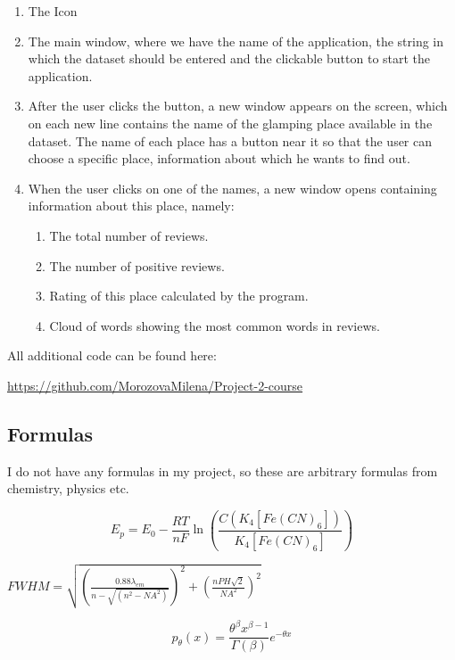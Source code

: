\documentclass[]{article}
\begin{document}
\begin{enumerate}
	\item The Icon
	\item The main window, where we have the name of the application, the string in which the dataset should be entered and the clickable button to start the application.
	\item After the user clicks the button, a new window appears on the screen, which on each new line contains the name of the glamping place available in the dataset. The name of each place has a button near it so that the user can choose a specific place, information about which he wants to find out.
	\item 	When the user clicks on one of the names, a new window opens containing information about this place, namely: 
	
	\begin{enumerate}
		\item The total number of reviews.
		\item The number of positive reviews.
		\item Rating of this place calculated by the program.
		\item Cloud of words showing the most common words in reviews.
	\end{enumerate}
\end{enumerate}

All additional code can be found here:

\url{https://github.com/MorozovaMilena/Project-2-course}

\vspace{3mm}
\subsection{Formulas}
I do not have any formulas in my project, so these are arbitrary formulas from chemistry, physics etc.

\[E_p=E_0-\frac{RT}{nF}\ln\left(\frac{C(K_4[Fe(CN)_6])}{K_4[Fe(CN)_6]}\right)\]

\vspace{2mm}

\Large $FWHM = \sqrt{(\frac{0.88\lambda_{em}}{n-\sqrt{(n^2-NA^2)}})^2+(\frac{nPH\sqrt{2}}{NA^2})^2}$ 

\vspace{2mm}

\[p_{\theta}(x) = \frac{\theta^{\beta} x^{\beta-1}}{\Gamma(\beta)} e^{-\theta x}\]

\vspace{2mm}
\end{document}
